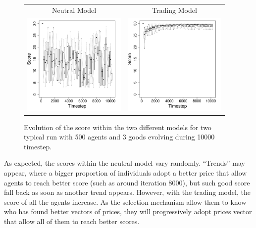 \documentclass{wscpaperproc}
\begin{document}
\begin{figure}[!h]
	\centering
	\begin{tabular}{ c c}
		 Neutral Model & Trading Model \\
		 \includegraphics[width=5cm]{img/ScoreEvolutionForRandom-G3N500.pdf}
		 & \includegraphics[width=5cm]{img/ScoreEvolutionForTrade-G3N500.pdf}

	\end{tabular}
	\caption{Evolution of the score within the two different models for two typical run with 500 agents and 3 goods evolving during 10000 timestep.}%
	\label{fig:scoreEvol}
\end{figure}


As expected, the scores within the neutral model vary randomly. ``Trends'' may appear, where a bigger proportion of individuals adopt a better price that allow agents to reach better score (such as around iteration 8000), but such good score fall back as soon as another trend appears. However, with the trading model, the score of all the agents increase. As the selection mechanism allow them to know who has found better vectors of prices, they will progressively adopt prices vector that allow all of them to reach better scores. 
\end{document}
